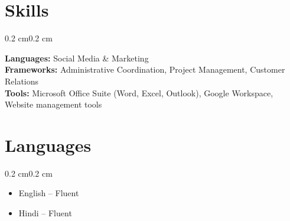 \documentclass[10pt, letterpaper]{article}
\newenvironment{highlights}{%
    \begin{itemize}[
        topsep=0.10 cm,%
        parsep=0.10 cm,%
        partopsep=0pt,%
        itemsep=0pt,%
        leftmargin=0.4 cm + 10pt%
    ]
}{%
    \end{itemize}%
}
\newenvironment{onecolentry}{%
    \begin{adjustwidth}{0.2 cm}{0.2 cm}%
}{%
    \end{adjustwidth}%
}
\begin{document}
\section{Skills}
\begin{onecolentry}
    \textbf{Languages:} Social Media \& Marketing\\
    \textbf{Frameworks:} Administrative Coordination, Project Management, Customer Relations\\
    \textbf{Tools:} Microsoft Office Suite (Word, Excel, Outlook), Google Workspace, Website management tools\\
\end{onecolentry}


\section{Languages}
\begin{onecolentry}
    \begin{highlights}
        \item English -- Fluent
        \item Hindi -- Fluent
    \end{highlights}
\end{onecolentry}
\end{document}
